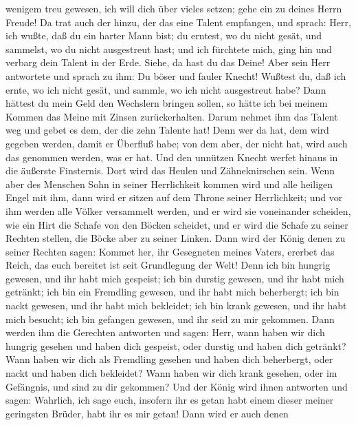 wenigem treu gewesen, ich will dich über vieles setzen; gehe ein zu
deines Herrn Freude!  Da trat auch der hinzu, der das
eine Talent empfangen, und sprach: Herr, ich wußte, daß du ein harter
Mann bist; du erntest, wo du nicht gesät, und sammelst, wo du nicht
ausgestreut hast;  und ich fürchtete mich, ging hin und
verbarg dein Talent in der Erde. Siehe, da hast du das Deine!
 Aber sein Herr antwortete und sprach zu ihm: Du böser
und fauler Knecht! Wußtest du, daß ich ernte, wo ich nicht gesät, und
sammle, wo ich nicht ausgestreut habe?  Dann hättest du
mein Geld den Wechslern bringen sollen, so hätte ich bei meinem Kommen
das Meine mit Zinsen zurückerhalten.  Darum nehmet ihm
das Talent weg und gebet es dem, der die zehn Talente hat!
 Denn wer da hat, dem wird gegeben werden, damit er
Überfluß habe; von dem aber, der nicht hat, wird auch das genommen
werden, was er hat.  Und den unnützen Knecht werfet
hinaus in die äußerste Finsternis. Dort wird das Heulen und
Zähneknirschen sein.  Wenn aber des Menschen Sohn in
seiner Herrlichkeit kommen wird und alle heiligen Engel mit ihm, dann
wird er sitzen auf dem Throne seiner Herrlichkeit;  und
vor ihm werden alle Völker versammelt werden, und er wird sie
voneinander scheiden, wie ein Hirt die Schafe von den Böcken scheidet,
 und er wird die Schafe zu seiner Rechten stellen, die
Böcke aber zu seiner Linken.  Dann wird der König denen
zu seiner Rechten sagen: Kommet her, ihr Gesegneten meines Vaters,
ererbet das Reich, das euch bereitet ist seit Grundlegung der Welt!
 Denn ich bin hungrig gewesen, und ihr habt mich
gespeist; ich bin durstig gewesen, und ihr habt mich getränkt; ich bin
ein Fremdling gewesen, und ihr habt mich beherbergt;  ich
bin nackt gewesen, und ihr habt mich bekleidet; ich bin krank gewesen,
und ihr habt mich besucht; ich bin gefangen gewesen, und ihr seid zu mir
gekommen.  Dann werden ihm die Gerechten antworten und
sagen: Herr, wann haben wir dich hungrig gesehen und haben dich
gespeist, oder durstig und haben dich getränkt?  Wann
haben wir dich als Fremdling gesehen und haben dich beherbergt, oder
nackt und haben dich bekleidet?  Wann haben wir dich
krank gesehen, oder im Gefängnis, und sind zu dir gekommen?
 Und der König wird ihnen antworten und sagen: Wahrlich,
ich sage euch, insofern ihr es getan habt einem dieser meiner geringsten
Brüder, habt ihr es mir getan!  Dann wird er auch denen
